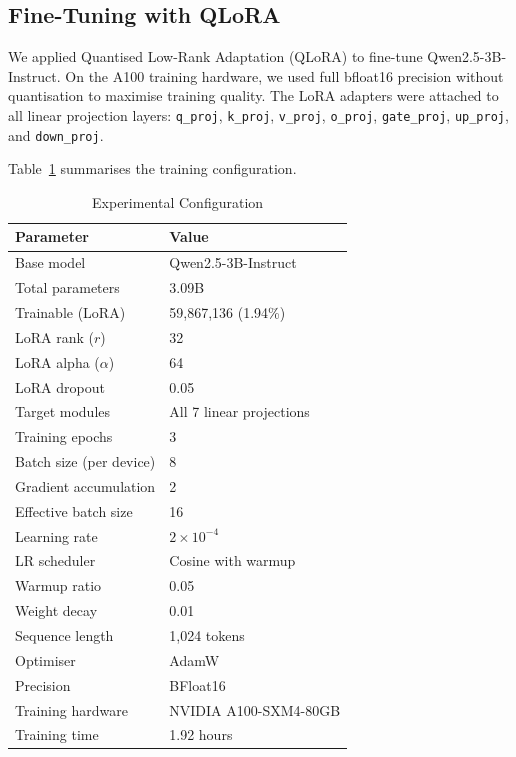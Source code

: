 \documentclass[journal]{IEEEtran}
\begin{document}
\subsection{Fine-Tuning with QLoRA}

We applied Quantised Low-Rank Adaptation (QLoRA) \cite{dettmers2023qlora}
to fine-tune Qwen2.5-3B-Instruct. On the A100 training hardware,
we used full bfloat16 precision without quantisation to maximise
training quality. The LoRA adapters were attached to all linear
projection layers: \texttt{q\_proj}, \texttt{k\_proj},
\texttt{v\_proj}, \texttt{o\_proj}, \texttt{gate\_proj},
\texttt{up\_proj}, and \texttt{down\_proj}.

Table~\ref{tab:config} summarises the training configuration.

\begin{table}[h!]
\centering
\caption{Experimental Configuration}
\label{tab:config}
\begin{tabular}{ll}
\toprule
\textbf{Parameter} & \textbf{Value} \\
\midrule
Base model              & Qwen2.5-3B-Instruct \\
Total parameters        & 3.09B \\
Trainable (LoRA)        & 59{,}867{,}136 (1.94\%) \\
LoRA rank ($r$)         & 32 \\
LoRA alpha ($\alpha$)   & 64 \\
LoRA dropout            & 0.05 \\
Target modules          & All 7 linear projections \\
Training epochs         & 3 \\
Batch size (per device) & 8 \\
Gradient accumulation   & 2 \\
Effective batch size    & 16 \\
Learning rate           & $2 \times 10^{-4}$ \\
LR scheduler            & Cosine with warmup \\
Warmup ratio            & 0.05 \\
Weight decay            & 0.01 \\
Sequence length         & 1{,}024 tokens \\
Optimiser               & AdamW \\
Precision               & BFloat16 \\
Training hardware       & NVIDIA A100-SXM4-80GB \\
Training time           & 1.92 hours \\
\bottomrule
\end{tabular}
\end{table}
\end{document}
